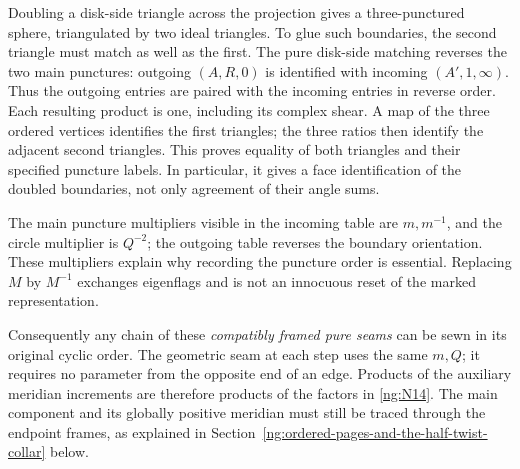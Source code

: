 Doubling a disk-side triangle across the projection gives a
three-punctured sphere, triangulated by two ideal triangles. To glue
such boundaries, the second triangle must match as well as the first.
The pure disk-side matching reverses the two main
punctures: outgoing \((A,R,0)\) is identified with incoming
\((A',1,\infty)\). Thus the outgoing entries are paired with
the incoming entries in reverse order. Each resulting product is
one, including its complex shear. A map of the three ordered
vertices identifies the first triangles; the three ratios then
identify the adjacent second triangles. This proves equality of both triangles and their specified puncture
labels. In particular, it gives a face identification of the doubled
boundaries, not only agreement of their angle sums.

The main puncture multipliers visible in the incoming table are
\(m,m^{-1}\), and the circle multiplier is \(Q^{-2}\);
the outgoing table reverses the boundary orientation. These
multipliers explain why recording the puncture order is essential.
Replacing \(M\) by \(M^{-1}\) exchanges eigenflags and is not
an innocuous reset of the marked representation.

Consequently any chain of these \emph{compatibly framed pure seams}
can be sewn in its original cyclic order. The geometric seam at
each step uses the same \(m,Q\); it requires no parameter from
the opposite end of an edge. Products of the auxiliary meridian
increments are therefore products of the factors in \eqref{ng:N14}.
The main component and its globally positive meridian
must still be traced through the endpoint frames, as explained
in Section~\ref{ng:ordered-pages-and-the-half-twist-collar} below.
